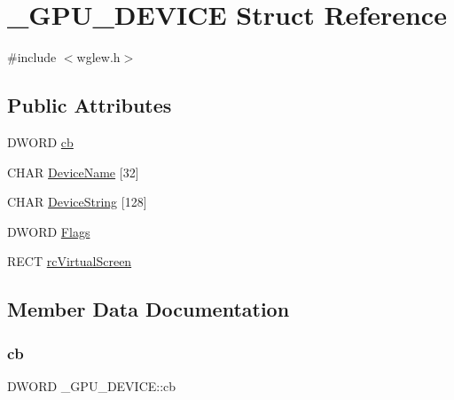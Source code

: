 \hypertarget{struct___g_p_u___d_e_v_i_c_e}{}\section{\+\_\+\+G\+P\+U\+\_\+\+D\+E\+V\+I\+CE Struct Reference}
\label{struct___g_p_u___d_e_v_i_c_e}


{\ttfamily \#include $<$wglew.\+h$>$}

\subsection*{Public Attributes}
\begin{DoxyCompactItemize}
\item 
D\+W\+O\+RD \hyperlink{struct___g_p_u___d_e_v_i_c_e_afcb22f16ba9e526610489ff56ab78ddb}{cb}
\item 
C\+H\+AR \hyperlink{struct___g_p_u___d_e_v_i_c_e_a604bfab61f1a2c5d1e635837d369ba14}{Device\+Name} \mbox{[}32\mbox{]}
\item 
C\+H\+AR \hyperlink{struct___g_p_u___d_e_v_i_c_e_aff8b7920ccc85afcd6f325da6cdb0b73}{Device\+String} \mbox{[}128\mbox{]}
\item 
D\+W\+O\+RD \hyperlink{struct___g_p_u___d_e_v_i_c_e_a008db9d0f5fc13a5160805f40465f14a}{Flags}
\item 
R\+E\+CT \hyperlink{struct___g_p_u___d_e_v_i_c_e_aeb573bbeb3b6c589246720ef259b9a27}{rc\+Virtual\+Screen}
\end{DoxyCompactItemize}


\subsection{Member Data Documentation}
\mbox{\label{struct___g_p_u___d_e_v_i_c_e_afcb22f16ba9e526610489ff56ab78ddb}} 
\subsubsection{\texorpdfstring{cb}{cb}}
{\footnotesize\ttfamily D\+W\+O\+RD \+\_\+\+G\+P\+U\+\_\+\+D\+E\+V\+I\+C\+E\+::cb}

\mbox{\label{struct___g_p_u___d_e_v_i_c_e_a604bfab61f1a2c5d1e635837d369ba14}} 
